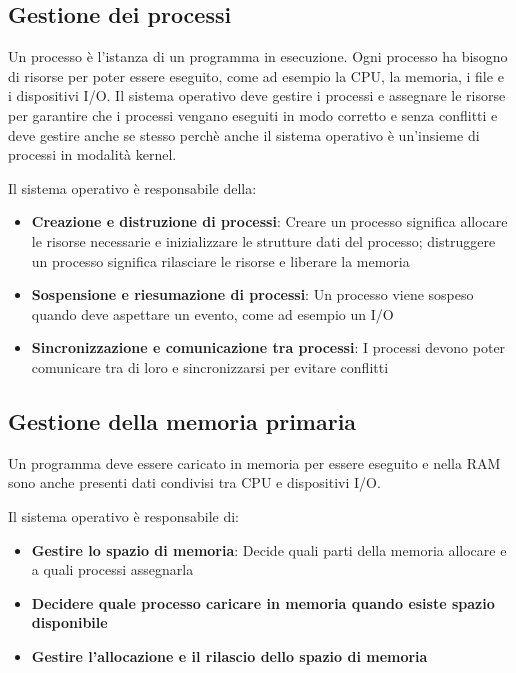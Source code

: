 \documentclass[a4paper]{article}
\begin{document}
\subsection{Gestione dei processi}
Un processo è l'istanza di un programma in esecuzione. Ogni processo ha bisogno di
risorse per poter essere eseguito, come ad esempio la CPU, la memoria, i file e i
dispositivi I/O. Il sistema operativo deve gestire i processi e assegnare le risorse per
garantire che i processi vengano eseguiti in modo corretto e senza conflitti e deve
gestire anche se stesso perchè anche il sistema operativo è un'insieme di processi in
modalità kernel.

\vspace{1em}
\noindent
Il sistema operativo è responsabile della:
\begin{itemize}
  \item \textbf{Creazione e distruzione di processi}: Creare un processo significa
    allocare le risorse necessarie e inizializzare le strutture dati del processo;
    distruggere un processo significa rilasciare le risorse e liberare la memoria

  \item \textbf{Sospensione e riesumazione di processi}: Un processo viene sospeso
    quando deve aspettare un evento, come ad esempio un I/O

  \item \textbf{Sincronizzazione e comunicazione tra processi}: I processi devono
    poter comunicare tra di loro e sincronizzarsi per evitare conflitti
\end{itemize}

\subsection{Gestione della memoria primaria}
Un programma deve essere caricato in memoria per essere eseguito e nella RAM sono anche
presenti dati condivisi tra CPU e dispositivi I/O.

\vspace{1em}
\noindent
Il sistema operativo è responsabile di:
\begin{itemize}
  \item \textbf{Gestire lo spazio di memoria}: Decide quali parti della memoria allocare
    e a quali processi assegnarla

  \item \textbf{Decidere quale processo caricare in memoria quando esiste spazio disponibile}

  \item \textbf{Gestire l'allocazione e il rilascio dello spazio di memoria}
\end{itemize}
\end{document}
